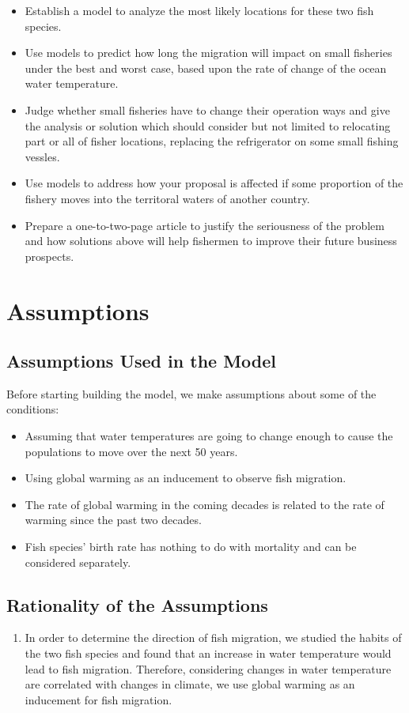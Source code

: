 \documentclass{mcmthesis}
\begin{document}
\begin{itemize}
	\item Establish a model to analyze the most likely locations for these two fish species.
	\item Use models to predict how long the migration will impact on small fisheries under the best and worst case, based upon the rate of change of the ocean water temperature.
	\item Judge whether small fisheries have to change their operation ways and give the analysis or solution which should consider but not limited to relocating part or all of fisher locations, replacing the refrigerator on some small fishing vessles.
	\item Use models to address how your proposal is affected if some proportion of the fishery moves into the territoral waters of another country.
	\item Prepare a one-to-two-page article to justify the seriousness of the problem and how solutions above will help fishermen to improve their future business prospects.
\end{itemize}

\section{Assumptions}
\subsection{Assumptions Used in the Model}
Before starting building the model, we make assumptions about some of the conditions:

\begin{itemize}
	\item Assuming that water temperatures are going to change enough to cause the populations to move over the next 50 years.
	\item Using global warming as an inducement to observe fish migration.
	\item The rate of global warming in the coming decades is related to the rate of warming since the past two decades.
	\item Fish species' birth rate has nothing to do with mortality and can be considered separately.
\end{itemize}

\subsection{Rationality of the Assumptions}
\begin{enumerate}
	\item In order to determine the direction of fish migration, we studied the habits of the two fish species and found that an increase in water temperature would lead to fish migration. Therefore, considering changes in water temperature are correlated with changes in climate, we use global warming as an inducement for fish migration.
\end{enumerate}
\end{document}
